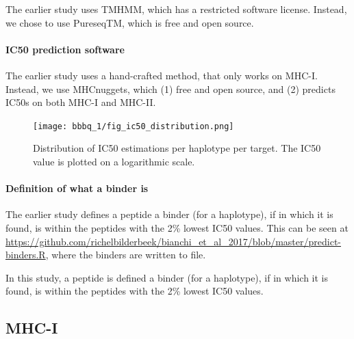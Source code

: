 The earlier study uses TMHMM, which has a restricted software license.
Instead, we chose to use PureseqTM, which is free and open source.

\paragraph{IC50 prediction software}

The earlier study uses a hand-crafted method, that only works on MHC-I.
Instead, we use MHCnuggets, which (1) free and open source, and (2) predicts
IC50s on both MHC-I and MHC-II.

\begin{figure}[!htbp]
  \texttt{[image: bbbq\_1/fig\_ic50\_distribution.png]}
  \caption{
    Distribution of IC50 estimations per haplotype per target.
    The IC50 value is plotted on a logarithmic scale.
  }
  \label{fig:1}
\end{figure}

\paragraph{Definition of what a binder is}

The earlier study defines a peptide a binder (for a haplotype), 
if  in which it is found, 
is within the peptides with the 2\% lowest IC50 values.
This can be seen at \url{https://github.com/richelbilderbeek/bianchi_et_al_2017/blob/master/predict-binders.R},
where the binders are written to file.

In this study, a peptide is defined a binder (for a haplotype), 
if  in which it is found, 
is within the peptides with the 2\% lowest IC50 values.



\subsection{MHC-I}



%   

